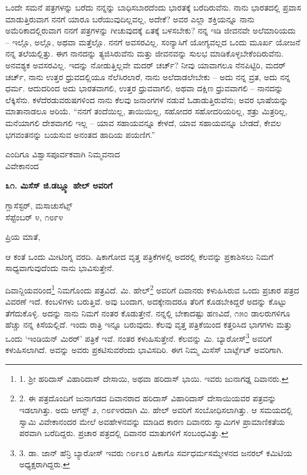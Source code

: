 ಒಂದೇ ಸಮನೆ ಪತ್ರಗಳನ್ನು ಬರೆದು ನನ್ನನ್ನು ಬಾಧಿಸಬಾರದೆಂದು ಭಾರತಕ್ಕೆ ಬರೆದಿರುವೆನು. ನಾನು ಭಾರತದಲ್ಲಿ ಪ್ರವಾಸ ಮಾಡುತ್ತಿರುವಾಗ ನನಗೆ ಯಾರೂ ಬರೆಯುವುದಿಲ್ಲವಲ್ಲ, ಅದೇಕೆ? ಅವರ ಎಲ್ಲಾ ಶಕ್ತಿಯನ್ನೂ ನಾನು ಅಮೆರಿಕಾದಲ್ಲಿರುವಾಗ ನನಗೆ ಪತ್ರಗಳನ್ನು ಗೀಚುವುದಕ್ಕೆ ಏತಕ್ಕೆ ಬಳಸಬೇಕು? ನನ್ನ ಇಡಿ ಜೀವನವೇ ಅಲೆಮಾರಿಯದು – ಇಲ್ಲೊ, ಅಲ್ಲೊ, ಅಥವಾ ಮತ್ತೆಲ್ಲೊ. ನನಗೆ ಅವಸರವಿಲ್ಲ. ಸಂನ್ಯಾಸಿಗೆ ಯೋಗ್ಯವಲ್ಲದ ಒಂದು ಮೂರ್ಖ ಯೋಜನೆ ನನ್ನ ತಲೆಯಲ್ಲಿತ್ತು. ಈಗ ನಾನದನ್ನು ತ್ಯಜಿಸಿರುವೆನು ಮತ್ತು ಜೀವನವನ್ನು ಸುಲಭ ಮಾಡಿಕೊಳ್ಳಬೇಕೆಂದಿರುವೆನು. ಅನವಶ್ಯಕ ಅವಸರವಿಲ್ಲ. ಇದನ್ನು ನೋಡುತ್ತಿಲ್ಲವೇ ಮದರ್ ಚರ್ಚ್? ನೀವು ಯಾವಾಗಲೂ ನೆನಪಿಟ್ಟಿರಿ, ಮದರ್ ಚರ್ಚ್, ನಾನು ಉತ್ತರ ಧ್ರುವದಲ್ಲಿಯೂ ನೆಲೆಸಿರಲಾರೆ, ನಾನು ಅಲೆದಾಡಲೇಬೇಕು – ಅದು ನನ್ನ ವ್ರತ, ಅದು ನನ್ನ ಧರ್ಮ. ಆದುದರಿಂದ ಅದು ಭಾರತವಾಗಲಿ, ಉತ್ತರ ಧ್ರುವವಾಗಲಿ, ಅಥವಾ ದಕ್ಷಿಣ ಧ್ರುವವಾಗಲಿ – ನಾನದನ್ನು ಲೆಕ್ಕಿಸೆನು. ಕಳೆದೆರಡುವರುಷಗಳಿಂದ ನಾನು ಕೆಲವು ಜನಾಂಗಗಳ ನಡುವೆ ಓಡಾಡುತ್ತಿರುವೆನು; ಅವರ ಭಾಷೆಯನ್ನು ಮಾತಾನಾಡಲೂ ಅರಿಯೆ. “ನನಗೆ ತಂದೆಯಿಲ್ಲ, ತಾಯಿಯಿಲ್ಲ, ಸಹೋದರ ಸಹೋದರಿಯರಿಲ್ಲ, ಶತ್ರು ಮಿತ್ರರಿಲ್ಲ, ಮನೆಯಾಗಲಿ ದೇಶವಾಗಲಿ ಇಲ್ಲ – ಯಾವ ಸಹಾಯವನ್ನೂ ಕೇಳದೆ, ಯಾವ ಸಹಾಯವನ್ನೂ ಬೇಡದೆ, ಕೇವಲ ಭಗವಂತನನ್ನು ಬಯಸುವ ಅನಂತದ ಹಾದಿಯ ಪಯಣಿಗ.”

\begin{flushright}
ಎಂದಿಗೂ ವಿಶ್ವಾಸಪೂರ್ವಕವಾಗಿ ನಿಮ್ಮವನಾದ\\ವಿವೇಕಾನಂದ
\end{flushright}

\begin{center}
\textbf{೩೧. ಮಿಸೆಸ್ ಜಿ.ಡಬ್ಲ್ಯೂ ಹೇಲ್ ಅವರಿಗೆ}
\end{center}

\begin{flushright}
ಗ್ಲಾಸೆಸ್ಟರ್, ಮಸಾಚುಸೆಟ್ಸ್\\ಸೆಪ್ಟೆಂಬರ್ ೪, ೧೮೯೪
\end{flushright}

ಪ್ರಿಯ ಮಾತೆ,

ಆ ಕಂತೆ ಒಂದು ಮೀಟಿಂಗ್ನ ವರದಿ. ಷಿಕಾಗೋದ ವೃತ್ತ ಪತ್ರಿಕೆಗಳಲ್ಲಿ ಅದರಲ್ಲಿ ಕೆಲವನ್ನು ಪ್ರಕಾಶಿಸಲು ನಿಮಗೆ ಸಾಧ್ಯವಾಗುವುದೆಂದು ನಾನು ಭಾವಿಸುತ್ತೇನೆ.

ದಿವಾನ್ಜಿಯವರಿಂದ\footnote{1. ಶ‍್ರೀ ಹರಿದಾಸ್ ವಿಹಾರಿದಾಸ್ ದೇಸಾಯಿ, ಅಥವಾ ಹರಿದಾಸ್ ಭಾಯಿ. ಇವರು ಜುನಾಗಢ್ನ ದಿವಾನರು.} ನಿಮಗೊಂದು ಪತ್ರವಿದೆ. ಮಿ. ಹೇಲ್\footnote{2. ಈ ಪತ್ರದೊಂದಿಗೆ ಜುನಾಗಡದ ದಿವಾನರಾದ ಹರಿದಾಸ್ ವಿಹಾರಿದಾಸ್ ದೇಸಾಯಿಯವರ ಪತ್ರವನ್ನು ಇಡಲಾಗಿತ್ತು. ಅದು ಆಗಸ್ಟ್ ೨, ೧೮೯೪ರದಾಗಿ ಮಿ. ಹೇಲ್ ಅವರಿಗೆ ಸಂಬೋಧಿಸಲಾಗಿತ್ತು. ಆ ಸಮಯದಲ್ಲಿ ಸ್ವಾಮಿ ವಿವೇಕಾನಂದರ ಮೇಲೆ ಅವಹೇಳನವನ್ನು ಮಾಡಿದ ಕಾರಣ ದಿವಾನರು ಸ್ವಾಮಿಗಳ ಪ್ರಾಮಾಣಿಕತೆಯ ಪರವಾಗಿ ಬರೆದಿದ್ದರು. ಪ್ರಚಾರ ಪತ್ರದಲ್ಲಿ ದಿವಾನರ ಮಾತುಗಳಿಗೆ ಸಂಬಂಧವಿತ್ತು.} ಅವರಿಗೆ ದಿವಾನರು ಕಳುಹಿಸಿರುವ ಒಂದು ಪ್ರಚಾರ ಪತ್ರದ ವಿವರಣೆ ಇದೆ. ಕಂಬಳಿಗಳು ಬರುತ್ತಿವೆ. ಅವು ಬಂದಾಗ, ಅದಕ್ಕೇನಾದರೂ ತೆರಿಗೆ ಕೊಡಬೇಕಿದ್ದರೆ ಅದನ್ನು ಕೊಟ್ಟು ತೆಗೆದುಕೊಳ್ಳಿ. ಅದನ್ನು ನಾನು ನಿಮಗೆ ನಂತರ ಕೊಡುತ್ತೇನೆ. ನನ್ನಲ್ಲಿ ಬೇಕಾದಷ್ಟು ಹಣವಿದೆ, ೧೫೦ ಡಾಲರುಗಳಿಗೂ ಹೆಚ್ಚು ನನ್ನ ಕಿಸೆಯಲ್ಲಿದೆ. ಇಂದು ರಾತ್ರಿ ಇನ್ನೂ ಬರುವುದು. ಕೆಲವು ವೃತ್ತ ಪತ್ರಿಕೆಯಿಂದ ಕತ್ತರಿಸಿದ ಭಾಗಗಳು ಮತ್ತು ಒಂದು ‘ಇಂಡಿಯನ್ ಮಿರರ್’ ಪತ್ರಿಕೆ ಇವೆ. ನಂತರ ಕಳುಹಿಸುತ್ತೇನೆ. ಕೆಲವನ್ನು ಮಿ. ಬ್ಯಾರೋಸ್\footnote{3. ಡಾ. ಜಾನ್ ಹೆನ್ರಿ ಬ್ಯಾರೋಸ್ ಇವರು ೧೮೯೩ರ ಷಿಕಾಗೊ ಸರ್ವಧರ್ಮಸಮ್ಮೇಳನದ ಜನರಲ್ ಕಮಿಟಿಯ ಅಧ್ಯಕ್ಷರಾಗಿದ್ದರು.} ಅವರಿಗೆ ಕಳುಹಿಸಲಾಗಿದೆ. ಅವನ್ನು ಅವರು ಪ್ರಕಟಿಸುವರೆಂದು ಭಾವಿಸದಿರಿ. ಈಗ ನಿಮ್ಮ ಮಿಸೆಸ್ ಬಾರ್ಟ್ಲೆಟ್ ಅವರಿಗಾಗಿ.

